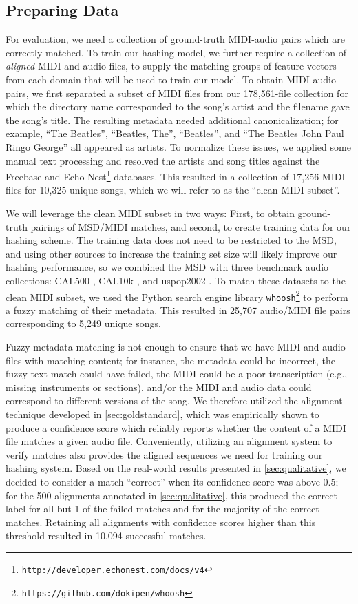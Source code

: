\subsection{Preparing Data}

For evaluation, we need a collection of ground-truth MIDI-audio pairs which are correctly matched.
To train our hashing model, we further require a collection of {\em aligned} MIDI and audio files, to supply the matching groups of feature vectors from each domain that will be used to train our model.
To obtain MIDI-audio pairs, we first separated a subset of MIDI files from our 178,561-file collection for which the directory name corresponded to the song's artist and the filename gave the song's title.
The resulting metadata needed additional canonicalization; for example, ``The Beatles'', ``Beatles, The'', ``Beatles'', and ``The Beatles John Paul Ringo George'' all appeared as artists.
To normalize these issues, we applied some manual text processing and resolved the artists and song titles against the Freebase \cite{bollacker2008freebase} and Echo Nest\footnote{\texttt{http://developer.echonest.com/docs/v4}} databases.
This resulted in a collection of 17,256 MIDI files for 10,325 unique songs, which we will refer to as the ``clean MIDI subset''.

We will leverage the clean MIDI subset in two ways: First, to obtain ground-truth pairings of MSD/MIDI matches, and second, to create training data for our hashing scheme.
The training data does not need to be restricted to the MSD, and using other sources to increase the training set size will likely improve our hashing performance, so we combined the MSD with three benchmark audio collections: CAL500 \cite{turnbull2007towards}, CAL10k \cite{tingle2010exploring}, and uspop2002 \cite{berenzweig2004large}.
To match these datasets to the clean MIDI subset, we used the Python search engine library \texttt{whoosh}\footnote{\texttt{https://github.com/dokipen/whoosh}} to perform a fuzzy matching of their metadata.
This resulted in 25,707 audio/MIDI file pairs corresponding to 5,249 unique songs.

Fuzzy metadata matching is not enough to ensure that we have MIDI and audio files with matching content; for instance, the metadata could be incorrect, the fuzzy text match could have failed, the MIDI could be a poor transcription (e.g., missing instruments or sections), and/or the MIDI and audio data could correspond to different versions of the song.
We therefore utilized the alignment technique developed in \cref{sec:goldstandard}, which was empirically shown to produce a confidence score which reliably reports whether the content of a MIDI file matches a given audio file.
Conveniently, utilizing an alignment system to verify matches also provides the aligned sequences we need for training our hashing system.
Based on the real-world results presented in \cref{sec:qualitative}, we decided to consider a match ``correct'' when its confidence score was above $0.5$; for the 500 alignments annotated in \cref{sec:qualitative}, this produced the correct label for all but 1 of the failed matches and for the majority of the correct matches.
Retaining all alignments with confidence scores higher than this threshold resulted in 10,094 successful matches.


